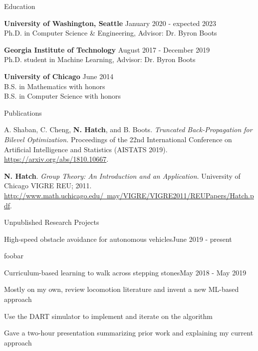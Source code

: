 \documentclass{resume} %
\begin{document}
\begin{rSection}{Education}

{\bf University of Washington, Seattle} \hfill {January 2020 - expected 2023} \\
Ph.D. in Computer Science \& Engineering, Advisor: Dr. Byron Boots

{\bf Georgia Institute of Technology} \hfill {August 2017 - December 2019} \\
Ph.D. student in Machine Learning, Advisor: Dr. Byron Boots

{\bf University of Chicago} \hfill {June 2014} \\
B.S. in Mathematics with honors \\
B.S. in Computer Science with honors \\

\end{rSection}

\begin{rSection}{Publications}

A. Shaban, C. Cheng, {\bf N. Hatch}, and B. Boots. {\em Truncated Back-Propagation for Bilevel Optimization.}
Proceedings of the 22nd International Conference on Artificial Intelligence and Statistics (AISTATS 2019).
\href{https://arxiv.org/abs/1810.10667}{https://arxiv.org/abs/1810.10667}.

{\bf N. Hatch}. {\em Group Theory: An Introduction and an Application}. University of Chicago VIGRE REU; 2011.
\href{http://www.math.uchicago.edu/~may/VIGRE/VIGRE2011/REUPapers/Hatch.pdf}{http://www.math.uchicago.edu/~may/VIGRE/VIGRE2011/REUPapers/Hatch.pdf}.

\end{rSection}

\begin{rSection}{Unpublished Research Projects}

\begin{rProject}{High-speed obstacle avoidance for autonomous vehicles}{June 2019 - present}
\item foobar
\end{rProject}

\begin{rProject}{Curriculum-based learning to walk across stepping stones}{May 2018 - May 2019}
\item Mostly on my own, review locomotion literature and invent a new ML-based approach
\item Use the DART simulator to implement and iterate on the algorithm
\item Gave a two-hour presentation summarizing prior work and explaining my current approach
\end{rProject}

\end{rSection}
\end{document}
